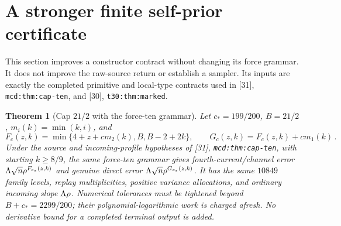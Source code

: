 \documentclass[11pt]{article}
\numberwithin{equation}{section}
\newtheorem{theorem}{Theorem}[section]
\theoremstyle{remark}\newtheorem{remark}[theorem]{Remark}
\newcommand{\src}[1]{\texttt{\nolinkurl{#1}}}
\begin{document}
\section{A stronger finite self-prior certificate}
\label{sec:cap-lift}
This section improves a constructor contract without changing its force
grammar. It does not improve the raw-source return or establish a sampler.
Its inputs are exactly the completed primitive and local-type contracts
used in [31], \src{mcd:thm:cap-ten}, and [30], \src{t30:thm:marked}.

\begin{theorem}[Cap $21/2$ with the force-ten grammar]
\label{thm:cap-lift}
Let $c_*=199/200$, $B=21/2$, $m_i(k)=\min(k,i)$, and
\[
 F_c(z,k)=\min\{4+z+cm_2(k),B,B-2+2k\},\qquad
 G_c(z,k)=F_c(z,k)+cm_1(k)\,.
\]
Under the source and incoming-profile hypotheses of [31],
\src{mcd:thm:cap-ten}, with starting $k\ge8/9$, the same force-ten
grammar gives fourth-current/channel error
$\Lambda\sqrt n\rho^{F_{c_*}(z,k)}$ and genuine direct error
$\Lambda\sqrt n\rho^{G_{c_*}(z,k)}$.
It has the same $10849$ family levels, replay multiplicities, positive
variance allocations, and ordinary incoming slope $\Lambda\rho$.
Numerical tolerances must be tightened beyond $B+c_*=2299/200$;
their polynomial-logarithmic work is charged afresh. No derivative
bound for a completed terminal output is added.
\end{theorem}
\end{document}
